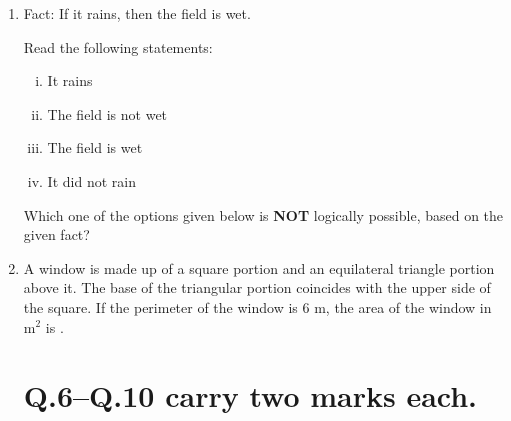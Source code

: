 \documentclass[journal,12pt,onecolumn]{IEEEtran}
\theoremstyle{remark}
\begin{document}
\begin{enumerate}
\item Fact: If it rains, then the field is wet.

Read the following statements:
\begin{enumerate}[(i)]
    \item It rains
    \item The field is not wet
    \item The field is wet
    \item It did not rain
\end{enumerate}
Which one of the options given below is \textbf{NOT} logically possible, based on the given fact?
 \hfill{}
\begin{enumerate}
\end{enumerate}

\item A window is made up of a square portion and an equilateral triangle portion above it. The base of the triangular portion coincides with the upper side of the square. If the perimeter of the window is $6$ m, the area of the window in m$^2$ is \underline{\hspace{1cm}}.
 \hfill{}
\begin{enumerate}
\end{enumerate}

\section*{Q.6--Q.10 carry two marks each.}


\end{enumerate}
\end{document}
